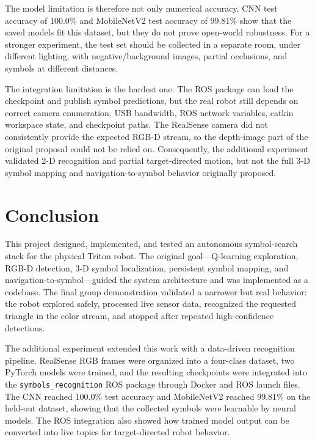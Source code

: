 \documentclass[letterpaper, 10 pt, conference]{ieeeconf/ieeeconf}
\begin{document}
The model limitation is therefore not only numerical accuracy.
CNN test accuracy of 100.0\% and MobileNetV2 test accuracy of 99.81\% show that
the saved models fit this dataset, but they do not prove open-world robustness.
For a stronger experiment, the test set should be collected in a separate room,
under different lighting, with negative/background images, partial occlusions,
and symbols at different distances.

The integration limitation is the hardest one.
The ROS package can load the checkpoint and publish symbol predictions, but the
real robot still depends on correct camera enumeration, USB bandwidth, ROS
network variables, catkin workspace state, and checkpoint paths.
The RealSense camera did not consistently provide the expected RGB-D stream,
so the depth-image part of the original proposal could not be relied on.
Consequently, the additional experiment validated 2-D recognition and partial
target-directed motion, but not the full 3-D symbol mapping and
navigation-to-symbol behavior originally proposed.

\section{Conclusion}
\label{sec:conclusion}

This project designed, implemented, and tested an autonomous symbol-search
stack for the physical Triton robot.
The original goal---Q-learning exploration, RGB-D detection, 3-D symbol
localization, persistent symbol mapping, and navigation-to-symbol---guided
the system architecture and was implemented as a codebase.
The final group demonstration validated a narrower but real behavior:
the robot explored safely, processed live sensor data, recognized the
requested triangle in the color stream, and stopped after repeated
high-confidence detections.

The additional experiment extended this work with a data-driven recognition
pipeline.
RealSense RGB frames were organized into a four-class dataset, two PyTorch
models were trained, and the resulting checkpoints were integrated into the
\texttt{symbols\_recognition} ROS package through Docker and ROS launch files.
The CNN reached 100.0\% test accuracy and MobileNetV2 reached 99.81\% on the
held-out dataset, showing that the collected symbols were learnable by neural
models.
The ROS integration also showed how trained model output can be converted
into live topics for target-directed robot behavior.
\end{document}
